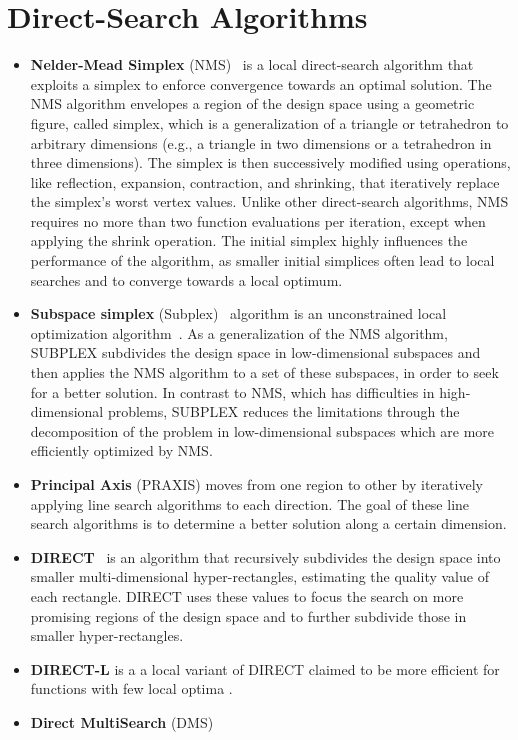 \section{Direct-Search Algorithms}
\begin{itemize}
	\item \textbf{Nelder-Mead Simplex} (NMS)~\cite{Nelder1964} is a local direct-search algorithm that exploits a simplex to enforce convergence towards an optimal solution. The NMS algorithm envelopes a region of the design space using a geometric figure, called simplex, which is a generalization of a triangle or tetrahedron to arbitrary dimensions (e.g., a triangle in two dimensions or a tetrahedron in three dimensions). The simplex is then successively modified using operations, like reflection, expansion, contraction, and shrinking, that iteratively replace the simplex's worst vertex values. Unlike other direct-search algorithms, NMS requires no more than two function evaluations per iteration, except when applying the shrink operation. The initial simplex highly influences the performance of the algorithm, as smaller initial simplices often lead to local searches and to converge towards a local optimum.
	
	\item \textbf{Subspace simplex} (Subplex)~\cite{Rowan1990} algorithm is an unconstrained local optimization algorithm~\cite{Rowan1990}. As a generalization of the NMS algorithm, SUBPLEX subdivides the design space in low-dimensional subspaces and then applies the NMS algorithm to a set of these subspaces, in order to seek for a better solution. In contrast to NMS, which has difficulties in high-dimensional problems, SUBPLEX reduces the limitations through the decomposition of the problem in low-dimensional subspaces which are more efficiently optimized by NMS.
	
	\item \textbf{Principal Axis} (PRAXIS) moves from one region to other by iteratively applying line search algorithms to each direction. The goal of these line search algorithms is to determine a better solution along a certain dimension.
	
	\item \textbf{DIRECT}~\cite{Jones1993DIRECT} is an algorithm that recursively subdivides the design space into smaller multi-dimensional hyper-rectangles, estimating the quality value of each rectangle. DIRECT uses these values to focus the search on more promising regions of the design space and to further subdivide those in smaller hyper-rectangles. 
	
	\item \textbf{DIRECT-L} is a a local variant of DIRECT claimed to be more efficient for functions with few local optima .
	
	
	\item \textbf{Direct MultiSearch} (DMS) %


\end{itemize}	

